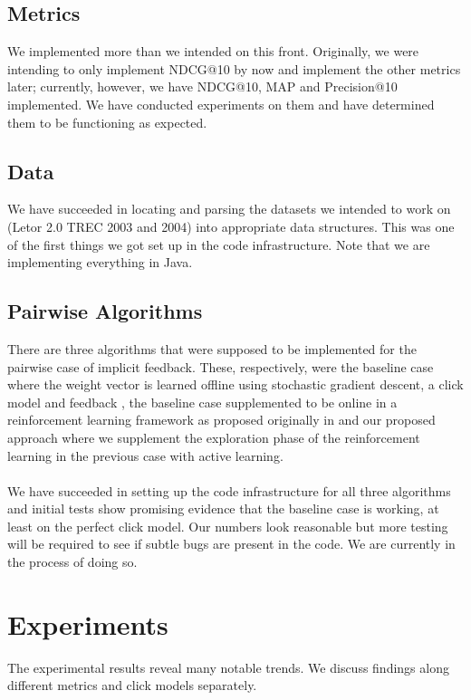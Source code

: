 \documentclass{acm_proc_article-sp}
\begin{document}
\subsection{Metrics}

We implemented more than we intended on this front. Originally, we were intending to only implement NDCG@10 by now and implement the other metrics later; currently, however, we have NDCG@10, MAP and Precision@10 implemented. We have conducted experiments on them and have determined them to be functioning as expected. 

\subsection{Data}

We have succeeded in locating and parsing the datasets we intended to work on (Letor 2.0 TREC 2003 and 2004) into appropriate data structures. This was one of the first things we got set up in the code infrastructure. Note that we are implementing everything in Java. 

\subsection{Pairwise Algorithms}

There are three algorithms that were supposed to be implemented for the pairwise case of implicit feedback. These, respectively, were the baseline case where the weight vector is learned offline using stochastic gradient descent, a click model and feedback \cite{joachims}, the baseline case supplemented to be online in a reinforcement learning framework as proposed originally in \cite{hofmann} and our proposed approach where we supplement the exploration phase of the reinforcement learning in the previous case with active learning. \\ \\
We have succeeded in setting up the code infrastructure for all three algorithms and initial tests show promising evidence that the baseline case is working, at least on the perfect click model. Our numbers look reasonable but more testing will be required to see if subtle bugs are present in the code. We are currently in the process of doing so.

\section{Experiments}
The experimental results reveal many notable trends.  We discuss findings along different metrics and click models separately.
\end{document}
